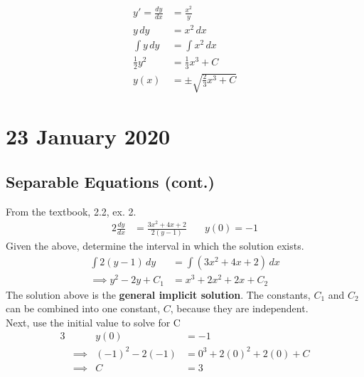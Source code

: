 \documentclass[twoside]{report}
\begin{document}
    \begin{homework}
        \begin{align}
            y' = \frac{dy}{dx} &= \frac{x^{2}}{y}\\
            y\,dy &= x^{2}\,dx\\
            \int y\,dy &= \int x^{2}\,dx\\
            \frac{1}{2}y^{2} &= \frac{1}{3}x^{3} + C\\
            y(x) &= \pm \sqrt{\frac{2}{3}x^{3} + C}
        \end{align}
    \end{homework}
    \chapter{23 January 2020}
    \section{Separable Equations (cont.)}
    \begin{example}
        From the textbook, 2.2, ex. 2.
        \begin{alignat}{2}
            \frac{dy}{dx}&=\frac{3x^2+4x+2}{2(y-1)} &\quad y(0) = -1
        \end{alignat}
        Given the above, determine the interval in which the solution exists.
        \begin{align}
            \int 2(y-1)\,dy&=\int (3x^{2} + 4x + 2)\,dx\\
            \implies y^2 - 2y + C_{1} &= x^3 + 2x^{2}+2x+C_2
        \end{align}
        The solution above is the \textbf{general implicit solution}. The constants, $C_{1}$ and $C_2$ can be combined into one constant, $C$, because they are independent.\\
        Next, use the initial value to solve for C
        \begin{alignat}{3}
            &&y(0) &= - 1\\
            &\implies & (-1)^{2} - 2(-1) &= 0^{3} + 2(0)^{2}+ 2(0) + C\\
            &\implies & C &= 3
        \end{alignat}
    \end{example}
    \np
\end{document}
